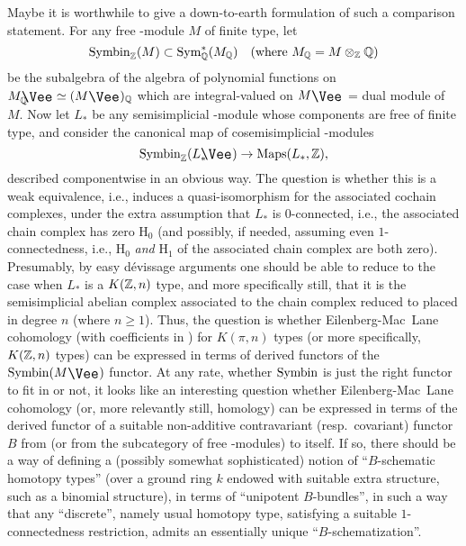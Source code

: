 Maybe it is worthwhile to give a down-to-earth formulation
of such a comparison statement. For any free \bZ-module $M$ of finite
type, let
\[\operatorname{Symbin}_{\mathbb{Z}}(M) \subset \operatorname{Sym}_{\mathbb{Q}}^*(M_{\mathbb{Q}})\quad\text{(where
    $M_{\mathbb{Q}}=M\otimes_{\mathbb{Z}} {\mathbb{Q}}$)}\]
be the subalgebra of the algebra of polynomial functions on
$M_\bQ\upvee \simeq (M\upvee)_\bQ$ which are integral-valued on
$M\upvee$ = dual module of $M$. Now let $L_*$ be any semisimplicial
\bZ-module whose components are free of finite type, and consider the
canonical map of cosemisimplicial \bZ-modules
\[\Symbin_\bZ(L_*\upvee) \to \Maps(L_*,\bZ),\]
described componentwise in an obvious way. The question is whether
this is a weak equivalence, i.e., induces a quasi-isomorphism for the
associated cochain complexes, under the extra assumption that $L_*$ is
$0$-connected, i.e., the associated chain complex has zero $\mathrm
H_0$ (and possibly, if needed, assuming even $1$-connectedness, i.e.,
$\mathrm H_0$ \emph{and} $\mathrm H_1$ of the associated chain complex
are both zero). Presumably, by easy dévissage arguments one should be
able to reduce to the case when $L_*$ is a $K({\mathbb{Z}},n)$ type, and more
specifically still, that it is the semisimplicial abelian complex
associated to the chain complex reduced to \bZ{} placed in degree $n$
(where $n\ge1$). Thus, the question is whether Eilenberg-Mac~Lane
cohomology (with coefficients in \bZ) for $K(\pi,n)$ types (or more
specifically, $K({\mathbb{Z}},n)$ types) can be expressed in terms of derived
functors of the $\Symbin(M\upvee)$ functor. At any rate, whether
$\operatorname{Symbin}$ is just the right functor to fit in or not, it looks like an
interesting question whether Eilenberg-Mac~Lane cohomology (or, more
relevantly still, homology) can be expressed in terms of the derived
functor of a suitable non-additive contravariant (resp.\ covariant)
functor $B$ from \Ab{} (or from the subcategory of free \bZ-modules)
to itself. If so, there should be a way of defining a (possibly
somewhat sophisticated) notion of ``$B$-schematic homotopy types''
(over a ground ring $k$ endowed with suitable extra structure, such as
a binomial structure), in terms of ``unipotent $B$-bundles'', in such
a way that any ``discrete'', namely usual homotopy type, satisfying a
suitable $1$-connectedness restriction, admits an essentially unique
``$B$-schematization''.

